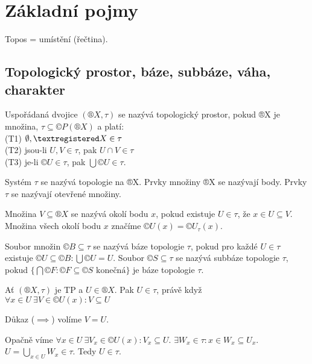 \documentclass[12pt]{article}					%
\begin{document}
\section{Základní pojmy}
    Topos = umístění (řečtina).

    \subsection{Topologický prostor, báze, subbáze, váha, charakter}

    \begin{definice}
        Uspořádaná dvojice $(®X, \tau)$ se nazývá topologický prostor, pokud ®X je množina, $\tau \subseteq ©P(®X)$ a platí:\\
        (T1) $\O, ®X \in \tau$\\
        (T2) jsou-li $U, V \in \tau$, pak $U \cap V \in \tau$\\
        (T3) je-li $©U \in \tau$, pak $\bigcup ©U \in \tau$.
    \end{definice}

    \begin{definice}[Topologie]
        Systém $\tau$ se nazývá topologie na ®X. Prvky množiny ®X se nazývají body. Prvky $\tau$ se nazývají otevřené množiny.
    \end{definice}

    \begin{definice}
        Množina $V \subseteq ®X$ se nazývá okolí bodu $x$, pokud existuje $U \in \tau$, že $x \in U \subseteq V$. Množina všech okolí bodu $x$ značíme $©U(x) = ©U_\tau(x)$.
    \end{definice}

    \begin{definice}
        Soubor množin $©B \subseteq \tau$ se nazývá báze topologie $\tau$, pokud pro každé $U\in \tau$ existuje $©U \subseteq ©B: \bigcup ©U = U$. Soubor $©S \subseteq \tau$ se nazývá subbáze topologie $\tau$, pokud $\{\bigcap ©F: ©F \subseteq ©S \text{ konečná}\}$ je báze topologie $\tau$.
    \end{definice}

    \begin{tvrzeni}
        Ať $(®X, \tau)$ je TP a $U \in ®X$. Pak $U \in \tau$, právě když $\forall x \in U\ \exists V\in ©U(x): V \subseteq U$
        \begin{dukazin}
            Důkaz ($\implies$) volíme $V = U$.

            Opačně víme $\forall x \in U\ \exists V_x\in©U(x): V_x \subseteq U$. $\exists W_x \in \tau: x\in W_x \subseteq U_x$. $U = \bigcup_{x\in U}W_x \in \tau$. Tedy $U \in \tau$.
        \end{dukazin}
    \end{tvrzeni}
\end{document}
